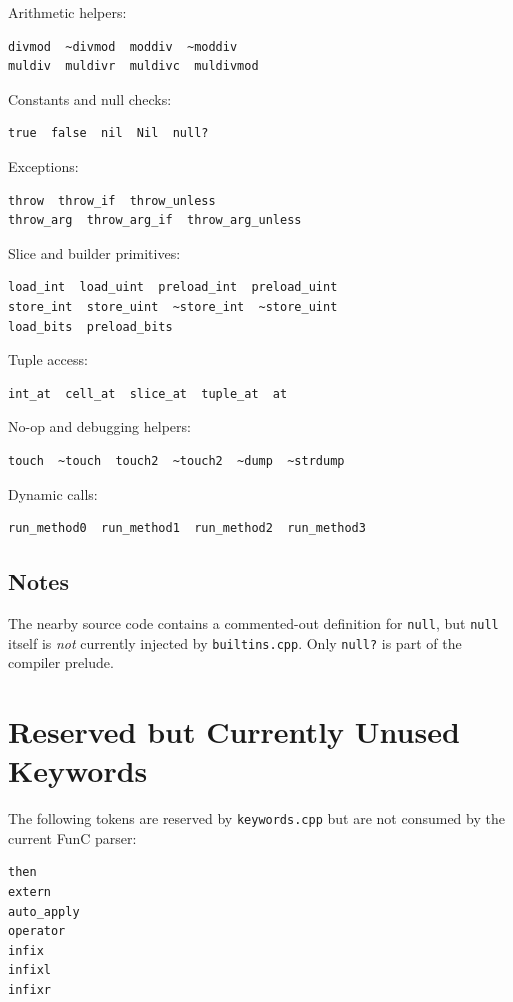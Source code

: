 \documentclass[12pt,oneside]{article}
\begin{document}
Arithmetic helpers:
\begin{verbatim}
divmod  ~divmod  moddiv  ~moddiv
muldiv  muldivr  muldivc  muldivmod
\end{verbatim}

Constants and null checks:
\begin{verbatim}
true  false  nil  Nil  null?
\end{verbatim}

Exceptions:
\begin{verbatim}
throw  throw_if  throw_unless
throw_arg  throw_arg_if  throw_arg_unless
\end{verbatim}

Slice and builder primitives:
\begin{verbatim}
load_int  load_uint  preload_int  preload_uint
store_int  store_uint  ~store_int  ~store_uint
load_bits  preload_bits
\end{verbatim}

Tuple access:
\begin{verbatim}
int_at  cell_at  slice_at  tuple_at  at
\end{verbatim}

No-op and debugging helpers:
\begin{verbatim}
touch  ~touch  touch2  ~touch2  ~dump  ~strdump
\end{verbatim}

Dynamic calls:
\begin{verbatim}
run_method0  run_method1  run_method2  run_method3
\end{verbatim}

\subsection{Notes}
The nearby source code contains a commented-out definition for \verb|null|, but
\verb|null| itself is \emph{not} currently injected by \verb|builtins.cpp|.
Only \verb|null?| is part of the compiler prelude.

\section{Reserved but Currently Unused Keywords}
The following tokens are reserved by \verb|keywords.cpp| but are not consumed by
the current FunC parser:

\begin{verbatim}
then
extern
auto_apply
operator
infix
infixl
infixr
\end{verbatim}
\end{document}
